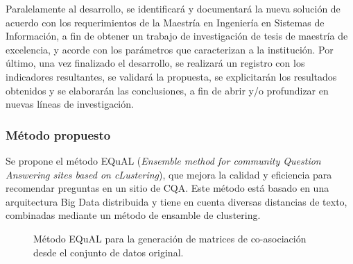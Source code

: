 Paralelamente al desarrollo, se identificará y documentará la nueva solución de acuerdo con los requerimientos de la Maestría en Ingeniería en Sistemas de Información, a fin de obtener un trabajo de investigación de tesis de maestría de excelencia, y acorde con los parámetros que caracterizan a la institución.
Por último, una vez finalizado el desarrollo, se realizará un registro con los indicadores resultantes, se validará la propuesta, se explicitarán los resultados obtenidos y se elaborarán las conclusiones, a fin de abrir y/o profundizar en nuevas líneas de investigación. 

\subsubsection{Método propuesto}
\noindent Se propone el método EQuAL (\textit{Ensemble method for community Question Answering sites based on cLustering}), que mejora la calidad y eficiencia para recomendar preguntas en un sitio de CQA. Este método está basado en una arquitectura Big Data distribuida y tiene en cuenta diversas distancias de texto, combinadas mediante un método de ensamble de clustering.
\begin{figure}
	\def\svgwidth{\linewidth}
	
	\caption{Método EQuAL para la generación de matrices de co-asociación desde el conjunto de datos original.}
\end{figure}

